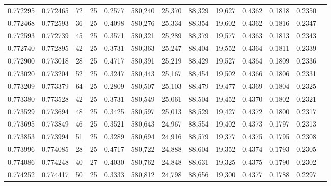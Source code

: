 \begin{tabular}{rrrrrrrrrrrrr}
0.772295 & 0.772465 &    72 &  25 &                                     0.2577 & 580,240 &  25,370 &  88,329 &  19,627 & 0.4362 & 0.1818 & 0.2350 \\
0.772468 & 0.772593 &    36 &  25 &                                     0.4098 & 580,276 &  25,334 &  88,354 &  19,602 & 0.4362 & 0.1816 & 0.2347 \\
0.772593 & 0.772739 &    45 &  25 &                                     0.3571 & 580,321 &  25,289 &  88,379 &  19,577 & 0.4363 & 0.1813 & 0.2343 \\
0.772740 & 0.772895 &    42 &  25 &                                     0.3731 & 580,363 &  25,247 &  88,404 &  19,552 & 0.4364 & 0.1811 & 0.2339 \\
0.772900 & 0.773018 &    28 &  25 &                                     0.4717 & 580,391 &  25,219 &  88,429 &  19,527 & 0.4364 & 0.1809 & 0.2336 \\
0.773020 & 0.773204 &    52 &  25 &                                     0.3247 & 580,443 &  25,167 &  88,454 &  19,502 & 0.4366 & 0.1806 & 0.2331 \\
0.773209 & 0.773379 &    64 &  25 &                                     0.2809 & 580,507 &  25,103 &  88,479 &  19,477 & 0.4369 & 0.1804 & 0.2325 \\
0.773380 & 0.773528 &    42 &  25 &                                     0.3731 & 580,549 &  25,061 &  88,504 &  19,452 & 0.4370 & 0.1802 & 0.2321 \\
0.773529 & 0.773694 &    48 &  25 &                                     0.3425 & 580,597 &  25,013 &  88,529 &  19,427 & 0.4372 & 0.1800 & 0.2317 \\
0.773695 & 0.773849 &    46 &  25 &                                     0.3521 & 580,643 &  24,967 &  88,554 &  19,402 & 0.4373 & 0.1797 & 0.2313 \\
0.773853 & 0.773994 &    51 &  25 &                                     0.3289 & 580,694 &  24,916 &  88,579 &  19,377 & 0.4375 & 0.1795 & 0.2308 \\
0.773996 & 0.774085 &    28 &  25 &                                     0.4717 & 580,722 &  24,888 &  88,604 &  19,352 & 0.4374 & 0.1793 & 0.2305 \\
0.774086 & 0.774248 &    40 &  27 &                                     0.4030 & 580,762 &  24,848 &  88,631 &  19,325 & 0.4375 & 0.1790 & 0.2302 \\
0.774252 & 0.774417 &    50 &  25 &                                     0.3333 & 580,812 &  24,798 &  88,656 &  19,300 & 0.4377 & 0.1788 & 0.2297 \\

\end{tabular}
